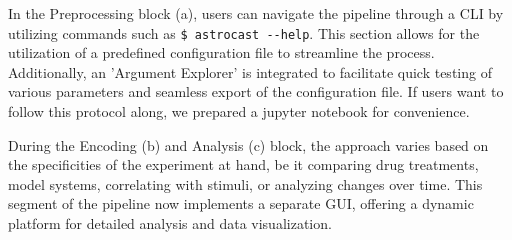 In the Preprocessing block (a), users can navigate the pipeline through a \ac{CLI} by utilizing commands such as \lstinline[style=bashStyle]{$ astrocast --help}. This section allows for the utilization of a predefined configuration file to streamline the process. Additionally, an 'Argument Explorer' is integrated to facilitate quick testing of various parameters and seamless export of the configuration file. If users want to follow this protocol along, we prepared a jupyter notebook for convenience.

During the Encoding (b) and Analysis (c) block, the approach varies based on the specificities of the experiment at hand, be it comparing drug treatments, model systems, correlating with stimuli, or analyzing changes over time. This segment of the pipeline now implements a separate GUI, offering a dynamic platform for detailed analysis and data visualization.
